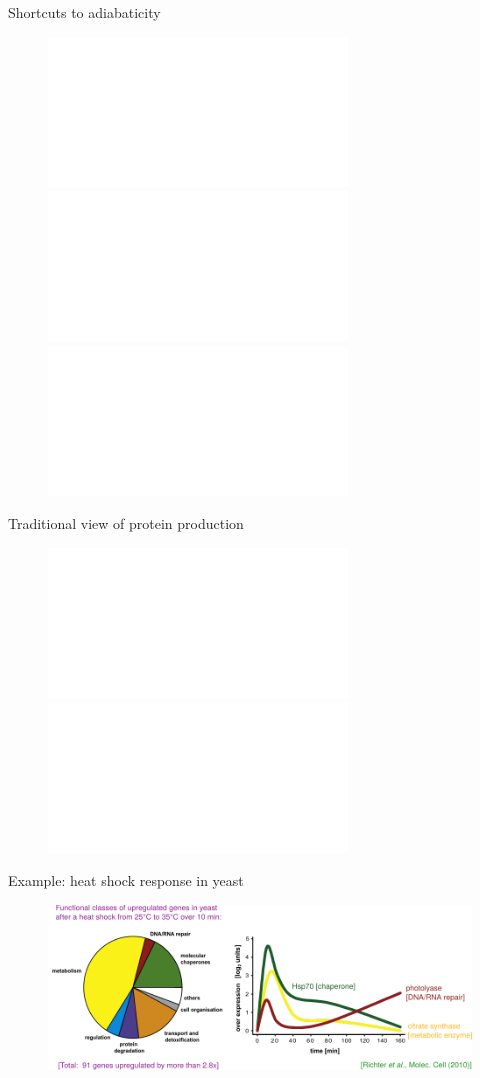 \documentclass{beamer}
\begin{document}
%

\begin{frame}{Shortcuts to adiabaticity}

  \begin{figure}
\includegraphics<1>[width=\textwidth]{analogy1.pdf}\includegraphics<2>[width=\textwidth]{analogy2.pdf}\includegraphics<3>[width=\textwidth]{analogy3.pdf}
  \end{figure}

\end{frame}

\begin{frame}{Traditional view of protein production}

  \begin{figure}
    \includegraphics<1>[width=\textwidth]{dogma1.pdf}\includegraphics<2>[width=\textwidth]{dogma2.pdf}
  \end{figure}
  
\end{frame}

\begin{frame}{Example: heat shock response in yeast}

  \vspace{1em}
  \begin{figure}
    \includegraphics[width=\textwidth]{yeast_response.pdf}
  \end{figure}
\end{frame}
\end{document}
